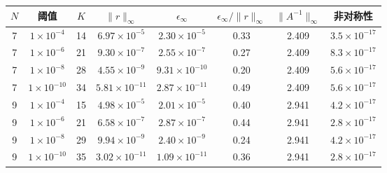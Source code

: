 \begin{tabular}{cccccccc}
\toprule
$N$ & 阈值 & $K$ & $\|r\|_\infty$ & $\epsilon_\infty$ & $\epsilon_\infty/\|r\|_\infty$ & $\|A^{-1}\|_\infty$ & 非对称性 \\
\midrule
7 & $1\times10^{-4}$ & 14 & $6.97\times10^{-5}$ & $2.30\times10^{-5}$ & 0.33 & 2.409 & $3.5\times10^{-17}$ \\
7 & $1\times10^{-6}$ & 21 & $9.30\times10^{-7}$ & $2.55\times10^{-7}$ & 0.27 & 2.409 & $8.3\times10^{-17}$ \\
7 & $1\times10^{-8}$ & 28 & $4.55\times10^{-9}$ & $9.31\times10^{-10}$ & 0.20 & 2.409 & $5.6\times10^{-17}$ \\
7 & $1\times10^{-10}$ & 34 & $5.81\times10^{-11}$ & $2.87\times10^{-11}$ & 0.49 & 2.409 & $5.6\times10^{-17}$ \\
9 & $1\times10^{-4}$ & 15 & $4.98\times10^{-5}$ & $2.01\times10^{-5}$ & 0.40 & 2.941 & $4.2\times10^{-17}$ \\
9 & $1\times10^{-6}$ & 21 & $6.58\times10^{-7}$ & $2.87\times10^{-7}$ & 0.44 & 2.941 & $2.8\times10^{-17}$ \\
9 & $1\times10^{-8}$ & 29 & $9.94\times10^{-9}$ & $2.40\times10^{-9}$ & 0.24 & 2.941 & $4.2\times10^{-17}$ \\
9 & $1\times10^{-10}$ & 35 & $3.02\times10^{-11}$ & $1.09\times10^{-11}$ & 0.36 & 2.941 & $2.8\times10^{-17}$ \\
\bottomrule
\end{tabular}
